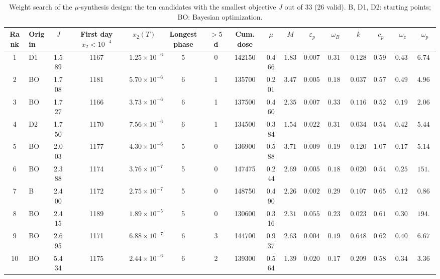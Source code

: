 \begin{table}[htbp]
\centering
\caption{Weight search of the $\mu$-synthesis design: the ten candidates with the smallest objective $J$ out of 33 (26 valid). B, D1, D2: starting points; BO: Bayesian optimization.}
\label{tab:mu_search}
\small
\begin{tabular}{clcccccccccccccc}
\toprule
Rank & Origin & $J$ & First day $x_2<10^{-4}$ & $x_2(T)$ & Longest phase & $>5$ d & Cum. dose & $\mu$ & $M$ & $\varepsilon_p$ & $\omega_B$ & $k$ & $c_p$ & $\omega_z$ & $\omega_p$ \\
\midrule
1 & D1 & 1.589 & 1167 & $1.25{\times}10^{-6}$ & 5 & 0 & 142150 & 0.466 & $1.839$ & $0.00704$ & $0.3111$ & $0.1286$ & $0.5945$ & $0.4347$ & $6.743$ \\
2 & BO & 1.708 & 1181 & $5.70{\times}10^{-6}$ & 6 & 1 & 135700 & 0.201 & $3.474$ & $0.00568$ & $0.1812$ & $0.03793$ & $0.5796$ & $0.4920$ & $4.966$ \\
3 & BO & 1.727 & 1166 & $3.73{\times}10^{-6}$ & 6 & 1 & 137500 & 0.460 & $2.350$ & $0.00755$ & $0.3344$ & $0.1164$ & $0.5200$ & $0.1928$ & $2.069$ \\
4 & D2 & 1.750 & 1170 & $7.56{\times}10^{-6}$ & 6 & 1 & 134500 & 0.384 & $1.544$ & $0.0221$ & $0.3159$ & $0.03404$ & $0.5477$ & $0.4228$ & $5.445$ \\
5 & BO & 2.003 & 1177 & $4.30{\times}10^{-6}$ & 5 & 0 & 136900 & 0.588 & $3.710$ & $0.00951$ & $0.1909$ & $0.1200$ & $1.076$ & $0.1756$ & $5.140$ \\
6 & BO & 2.388 & 1174 & $3.76{\times}10^{-7}$ & 5 & 0 & 147475 & 0.244 & $2.699$ & $0.00506$ & $0.1812$ & $0.02082$ & $0.5426$ & $0.2585$ & $151.7$ \\
7 & B & 2.400 & 1172 & $2.75{\times}10^{-7}$ & 5 & 0 & 148750 & 0.490 & $2.269$ & $0.00258$ & $0.2978$ & $0.1070$ & $0.6501$ & $0.1253$ & $0.8660$ \\
8 & BO & 2.415 & 1189 & $1.89{\times}10^{-5}$ & 5 & 0 & 130600 & 0.316 & $2.310$ & $0.0554$ & $0.2342$ & $0.02386$ & $0.6193$ & $0.3063$ & $194.8$ \\
9 & BO & 2.695 & 1171 & $6.88{\times}10^{-7}$ & 6 & 3 & 144700 & 0.937 & $2.636$ & $0.00462$ & $0.1935$ & $0.6485$ & $0.6262$ & $0.4051$ & $6.676$ \\
10 & BO & 5.434 & 1175 & $2.44{\times}10^{-6}$ & 6 & 2 & 139300 & 0.564 & $1.398$ & $0.0202$ & $0.1720$ & $0.2097$ & $0.5845$ & $0.3497$ & $3.365$ \\
\bottomrule
\end{tabular}
\end{table}
